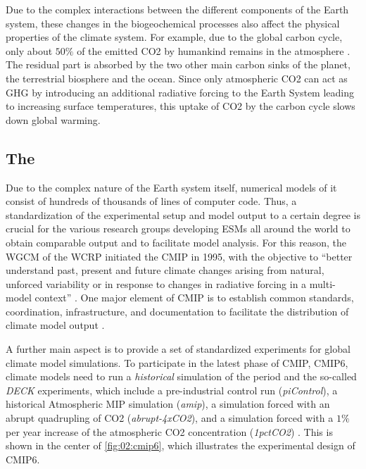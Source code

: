 Due to the complex interactions between the different components of the Earth
system, these changes in the biogeochemical processes also affect the physical
properties of the climate system. For example, due to the global carbon cycle,
only about $50 \unit{\%}$ of the emitted \ac{CO2} by humankind remains in the
atmosphere \autocite{Friedlingstein2020}. The residual part is absorbed by the
two other main carbon sinks of the planet, the terrestrial biosphere and the
ocean. Since only atmospheric \ac{CO2} can act as \ac{GHG} by introducing an
additional radiative forcing to the Earth System leading to increasing surface
temperatures, this uptake of \ac{CO2} by the carbon cycle slows down global
warming.


\subsection{The }
\label{subsec:02:cmip}

Due to the complex nature of the Earth system itself, numerical models of it
consist of hundreds of thousands of lines of computer code. Thus, a
standardization of the experimental setup and model output to a certain degree
is crucial for the various research groups developing \acp{ESM} all around the
world to obtain comparable output and to facilitate model analysis. For this
reason, the \ac{WGCM} of the \ac{WCRP} initiated the \acf{CMIP} in 1995, with
the objective to \enquote{better understand past, present and future climate
  changes arising from natural, unforced variability or in response to changes
  in radiative forcing in a multi-model context} \autocite{WCRP2020}. One major
element of \ac{CMIP} is to establish common standards, coordination,
infrastructure, and documentation to facilitate the distribution of climate
model output \autocite{Eyring2016, Juckes2020}.

A further main aspect is to provide a set of standardized experiments for
global climate model simulations. To participate in the latest phase of
\ac{CMIP}, \acs{CMIP}6, climate models need to run a \emph{historical}
simulation of the period  and the so-called \emph{\ac{DECK}}
experiments, which include a pre-industrial control run (\emph{piControl}), a
historical Atmospheric \ac{MIP} simulation (\emph{amip}), a simulation forced
with an abrupt quadrupling of \ac{CO2} (\emph{abrupt-4xCO2}), and a simulation
forced with a $1 \unit{\%}$ per year increase of the atmospheric \ac{CO2}
concentration (\emph{1pctCO2}) \autocite{Eyring2016}. This is shown in the
center of \cref{fig:02:cmip6}, which illustrates the experimental design of
\acs{CMIP}6.

